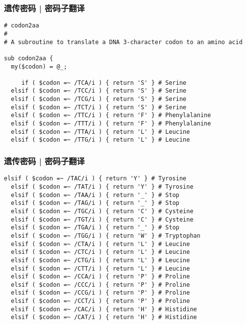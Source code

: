 \begin{frame}[fragile]
  \frametitle{遗传密码 | 密码子翻译}
\begin{lstlisting}[firstnumber=1,basicstyle=\footnotesize\tt,numberstyle=\scriptsize]
# codon2aa
#
# A subroutine to translate a DNA 3-character codon to an amino acid

sub codon2aa {
  my($codon) = @_;
          
     if ( $codon =~ /TCA/i ) { return 'S' } # Serine
  elsif ( $codon =~ /TCC/i ) { return 'S' } # Serine
  elsif ( $codon =~ /TCG/i ) { return 'S' } # Serine
  elsif ( $codon =~ /TCT/i ) { return 'S' } # Serine
  elsif ( $codon =~ /TTC/i ) { return 'F' } # Phenylalanine
  elsif ( $codon =~ /TTT/i ) { return 'F' } # Phenylalanine
  elsif ( $codon =~ /TTA/i ) { return 'L' } # Leucine
  elsif ( $codon =~ /TTG/i ) { return 'L' } # Leucine
\end{lstlisting}
\end{frame}

\begin{frame}[fragile]
  \frametitle{遗传密码 | 密码子翻译}
\begin{lstlisting}[firstnumber=16,basicstyle=\footnotesize\tt,numberstyle=\scriptsize]
  elsif ( $codon =~ /TAC/i ) { return 'Y' } # Tyrosine
  elsif ( $codon =~ /TAT/i ) { return 'Y' } # Tyrosine
  elsif ( $codon =~ /TAA/i ) { return '_' } # Stop
  elsif ( $codon =~ /TAG/i ) { return '_' } # Stop
  elsif ( $codon =~ /TGC/i ) { return 'C' } # Cysteine
  elsif ( $codon =~ /TGT/i ) { return 'C' } # Cysteine
  elsif ( $codon =~ /TGA/i ) { return '_' } # Stop
  elsif ( $codon =~ /TGG/i ) { return 'W' } # Tryptophan
  elsif ( $codon =~ /CTA/i ) { return 'L' } # Leucine
  elsif ( $codon =~ /CTC/i ) { return 'L' } # Leucine
  elsif ( $codon =~ /CTG/i ) { return 'L' } # Leucine
  elsif ( $codon =~ /CTT/i ) { return 'L' } # Leucine
  elsif ( $codon =~ /CCA/i ) { return 'P' } # Proline
  elsif ( $codon =~ /CCC/i ) { return 'P' } # Proline
  elsif ( $codon =~ /CCG/i ) { return 'P' } # Proline
  elsif ( $codon =~ /CCT/i ) { return 'P' } # Proline
  elsif ( $codon =~ /CAC/i ) { return 'H' } # Histidine
  elsif ( $codon =~ /CAT/i ) { return 'H' } # Histidine
\end{lstlisting}
\end{frame}

